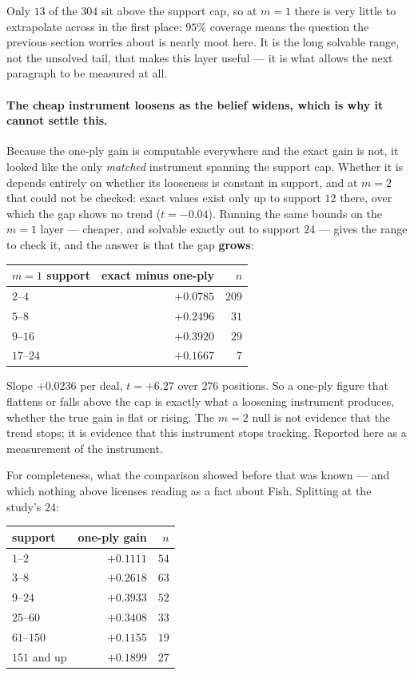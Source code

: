 \documentclass[11pt,a4paper]{article}
\begin{document}
Only $13$ of the $304$ sit above the support cap, so at $m = 1$ there is very
little to extrapolate across in the first place: $95\%$ coverage means the
question the previous section worries about is nearly moot here. It is the
long solvable range, not the unsolved tail, that makes this layer useful --- it
is what allows the next paragraph to be measured at all.

\paragraph{The cheap instrument loosens as the belief widens, which is why it
cannot settle this.} Because the one-ply gain is computable everywhere and the
exact gain is not, it looked like the only \emph{matched} instrument spanning
the support cap. Whether it is depends entirely on whether its looseness is
constant in support, and at $m = 2$ that could not be checked: exact values
exist only up to support $12$ there, over which the gap shows no trend
($t = -0.04$). Running the same bounds on the $m = 1$ layer --- cheaper, and
solvable exactly out to support $24$ --- gives the range to check it, and the
answer is that the gap \textbf{grows}:

\begin{center}
\begin{tabular}{lrr}
\toprule
$m = 1$ support & exact minus one-ply & $n$ \\
\midrule
$2$--$4$   & $+0.0785$ & $209$ \\
$5$--$8$   & $+0.2496$ & $31$ \\
$9$--$16$  & $+0.3920$ & $29$ \\
$17$--$24$ & $+0.1667$ & $7$ \\
\bottomrule
\end{tabular}
\end{center}

Slope $+0.0236$ per deal, $t = \mathbf{+6.27}$ over $276$ positions. So a
one-ply figure that flattens or falls above the cap is exactly what a
loosening instrument produces, whether the true gain is flat or rising. The
$m = 2$ null is not evidence that the trend stops; it is evidence that this
instrument stops tracking. Reported here as a measurement of the instrument.

For completeness, what the comparison showed before that was known --- and
which nothing above licenses reading as a fact about Fish. Splitting at the
study's $24$:

\begin{center}
\begin{tabular}{lrr}
\toprule
support & one-ply gain & $n$ \\
\midrule
$1$--$2$      & $+0.1111$ & $54$ \\
$3$--$8$      & $+0.2618$ & $63$ \\
$9$--$24$     & $+0.3933$ & $52$ \\
$25$--$60$    & $+0.3408$ & $33$ \\
$61$--$150$   & $+0.1155$ & $19$ \\
$151$ and up  & $+0.1899$ & $27$ \\
\bottomrule
\end{tabular}
\end{center}
\end{document}
